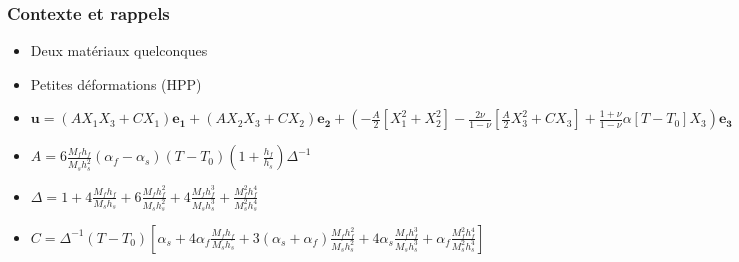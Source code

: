 \documentclass{beamer}
\begin{document}
\begin{frame}
    \frametitle{Contexte et rappels}
    \begin{itemize}
        \item Deux matériaux quelconques
        \item Petites déformations (HPP)
        \item $\bm{u} = (AX_1X_3 + CX_1)\bm{e_1} + (AX_2X_3 + CX_2)\bm{e_2} + (-\frac{A}{2}\left[X_1^2+X_2^2\right]-\frac{2\nu}{1-\nu}\left[\frac{A}{2}X_3^2+CX_3\right]+\frac{1+\nu}{1-\nu}\alpha\left[T-T_0\right]X_3)\bm{e_3}$
        \item $A = 6\frac{M_fh_f}{M_sh_s^2}(\alpha_f-\alpha_s)(T-T_0)(1+\frac{h_f}{h_s})\Delta^{-1}$
        \item $\Delta = 1+4\frac{M_fh_f}{M_sh_s}+6\frac{M_fh_f^2}{M_sh_s^2}+4\frac{M_fh_f^3}{M_sh_s^3}+\frac{M_f^2h_f^4}{M_s^2h_s^4}$
        \item $C = \Delta^{-1}(T-T_0)\left[\alpha_s + 4 \alpha_f \frac{M_fh_f}{M_sh_s} + 3 (\alpha_s + \alpha_f)\frac{M_fh_f^2}{M_sh_s^2} + 4\alpha_s \frac{M_fh_f^3}{M_sh_s^3} + \alpha_f \frac{M_f^2h_f^4}{M_s^2h_s^4}  \right]$
    \end{itemize}
\end{frame}
    
\end{document}
